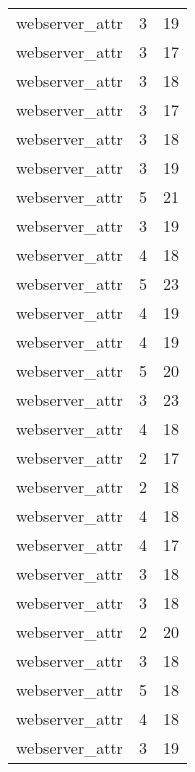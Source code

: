 \begin{table}
\begin{tabular}{lrr}
                  webserver\_attr &         3 &        19 \\
                  webserver\_attr &         3 &        17 \\
                  webserver\_attr &         3 &        18 \\
                  webserver\_attr &         3 &        17 \\
                  webserver\_attr &         3 &        18 \\
                  webserver\_attr &         3 &        19 \\
                  webserver\_attr &         5 &        21 \\
                  webserver\_attr &         3 &        19 \\
                  webserver\_attr &         4 &        18 \\
                  webserver\_attr &         5 &        23 \\
                  webserver\_attr &         4 &        19 \\
                  webserver\_attr &         4 &        19 \\
                  webserver\_attr &         5 &        20 \\
                  webserver\_attr &         3 &        23 \\
                  webserver\_attr &         4 &        18 \\
                  webserver\_attr &         2 &        17 \\
                  webserver\_attr &         2 &        18 \\
                  webserver\_attr &         4 &        18 \\
                  webserver\_attr &         4 &        17 \\
                  webserver\_attr &         3 &        18 \\
                  webserver\_attr &         3 &        18 \\
                  webserver\_attr &         2 &        20 \\
                  webserver\_attr &         3 &        18 \\
                  webserver\_attr &         5 &        18 \\
                  webserver\_attr &         4 &        18 \\
                  webserver\_attr &         3 &        19 \\

\end{tabular}
\end{table}
